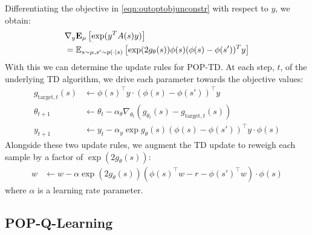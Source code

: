Differentiating the objective in \cref{eqn:outoptobjunconstr} with respect to $y$, we obtain:
\begin{align}
   & \nabla_y \mathbf{E}_\mu \left [ \exp (y^T A(s) y) \right ]
  \\ & =
  \mathbb{E}_{s \sim \mu, s' \sim p(\cdot|s)} \left [ \exp(2 g_\theta(s)) \phi(s)(\phi(s) - \phi(s'))^T y \right ] \nonumber
\end{align}
With this we can determine the update rules for POP-TD. At each step, $t$, of the underlying TD algorithm, we drive each parameter towards the objective values:
\begin{align}
  g_{\text{target}, t}(s) &\gets \phi(s)^\top y \cdot (\phi(s) - \phi(s'))^\top y \\
  \theta_{t+1} &\gets \theta_t - \alpha_\theta \nabla_{\theta_t} (g_{\theta_t}(s) - g_{\text{target}, t}(s)) \\
  y_{t+1} &\gets y_t - \alpha_y \exp{g_\theta(s)} (\phi(s) - \phi(s'))^\top y \cdot \phi(s)
\end{align}
Alongside these two update rules, we augment the TD update to reweigh each sample by a factor of $\exp(2 g_\theta(s))$:
\begin{align}
  w & \gets w - \alpha \exp(2 g_\theta(s)) (\phi(s)^\top w - r - \phi(s')^\top w) \cdot \phi(s)
\end{align}
where $\alpha$ is a learning rate parameter.

\subsection{POP-Q-Learning}\label{sec:popq}


